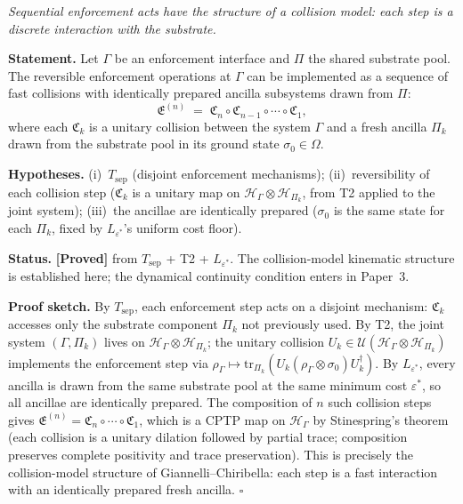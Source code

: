 \documentclass[11pt]{article}
\theoremstyle{remark}
\begin{document}
\begin{tcolorbox}[apfbox, title={$P_{\mathrm{coll}}$: Enforcement Steps as a Collision Model}]
\textit{Sequential enforcement acts have the structure of a collision model: each step is a discrete interaction with the substrate.}

\smallskip\noindent\textbf{Statement.}  Let $\Gamma$ be an enforcement interface and $\Pi$ the shared substrate pool.  The reversible enforcement operations at $\Gamma$ can be implemented as a sequence of fast collisions with identically prepared ancilla subsystems drawn from $\Pi$:
\[
  \mathfrak{E}^{(n)} \;=\; \mathfrak{C}_n \circ \mathfrak{C}_{n-1} \circ \cdots \circ \mathfrak{C}_1,
\]
where each $\mathfrak{C}_k$ is a unitary collision between the system $\Gamma$ and a fresh ancilla $\Pi_k$ drawn from the substrate pool in its ground state $\sigma_0 \in \Omega$.

\smallskip\noindent\textbf{Hypotheses.}  (i)~$T_{\mathrm{sep}}$ (disjoint enforcement mechanisms); (ii)~reversibility of each collision step ($\mathfrak{C}_k$ is a unitary map on $\mathcal{H}_\Gamma \otimes \mathcal{H}_{\Pi_k}$, from T2 applied to the joint system); (iii)~the ancillae are identically prepared ($\sigma_0$ is the same state for each $\Pi_k$, fixed by $L_{\varepsilon^*}$'s uniform cost floor).

\smallskip\noindent\textbf{Status.}  \textbf{[Proved]} from $T_{\mathrm{sep}}$ + T2 + $L_{\varepsilon^*}$.  The collision-model kinematic structure is established here; the dynamical continuity condition enters in Paper~3.

\smallskip\noindent\textbf{Proof sketch.}  By $T_{\mathrm{sep}}$, each enforcement step acts on a disjoint mechanism: $\mathfrak{C}_k$ accesses only the substrate component $\Pi_k$ not previously used.  By T2, the joint system $(\Gamma, \Pi_k)$ lives on $\mathcal{H}_\Gamma \otimes \mathcal{H}_{\Pi_k}$; the unitary collision $U_k \in \mathcal{U}(\mathcal{H}_\Gamma \otimes \mathcal{H}_{\Pi_k})$ implements the enforcement step via $\rho_\Gamma \mapsto \mathrm{tr}_{\Pi_k}(U_k (\rho_\Gamma \otimes \sigma_0) U_k^\dagger)$.  By $L_{\varepsilon^*}$, every ancilla is drawn from the same substrate pool at the same minimum cost $\varepsilon^*$, so all ancillae are identically prepared.  The composition of $n$ such collision steps gives $\mathfrak{E}^{(n)} = \mathfrak{C}_n \circ \cdots \circ \mathfrak{C}_1$, which is a CPTP map on $\mathcal{H}_\Gamma$ by Stinespring's theorem (each collision is a unitary dilation followed by partial trace; composition preserves complete positivity and trace preservation).  This is precisely the collision-model structure of Giannelli--Chiribella: each step is a fast interaction with an identically prepared fresh ancilla.  \hfill$\square$


\end{tcolorbox}
\end{document}

